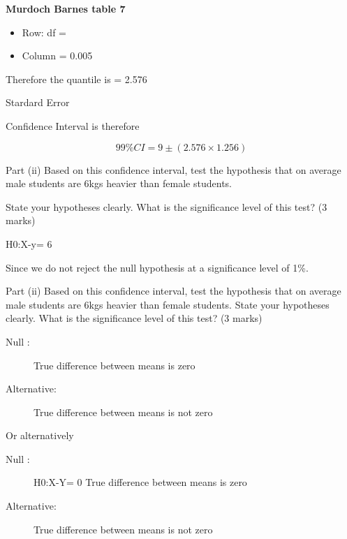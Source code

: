 ﻿\documentclass[]{report}
\begin{document}
\begin{framed}
\noindent \textbf{Murdoch Barnes table 7}

\begin{itemize}
\item Row: df =  
\item Column = 0.005

\end{itemize}

Therefore the quantile is =  2.576 
\end{framed}

Stardard Error






Confidence Interval is therefore

\[99\% CI = 9 \pm (2.576 \times 1.256) \]


Part (ii)
Based on this confidence interval, test the hypothesis that on average male students are 6kgs heavier than female students.

State your hypotheses clearly. What is the significance level of this test?   (3 marks)

H0:X-y= 6




Since  we do not reject the null hypothesis at a significance level of 1\%.





Part (ii)
Based on this confidence interval, test the hypothesis that on average male students are 6kgs heavier than female students.
State your hypotheses clearly. What is the significance level of this test?   (3 marks)

\begin{description}

\item[Null :]                 True difference between means is zero

\item[Alternative:]         True difference between means is not zero
\end{description}
Or alternatively

\begin{description}
\item[Null :]              H0:X-Y= 0   True difference between means is zero

\item[Alternative:]         True difference between means is not zero
\end{description}
\end{document}
